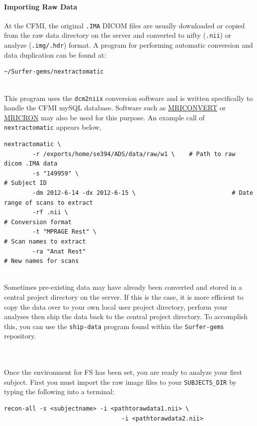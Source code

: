 \documentclass[paper=a4, fontsize=11pt]{scrartcl} %
\numberwithin{equation}{section} %
\numberwithin{figure}{section} %
\numberwithin{table}{section} %
\begin{document}
\paragraph{Importing Raw Data} At the CFMI, the original \texttt{.IMA} DICOM files are usually downloaded or copied from the raw data directory on the server and converted to nifty (\texttt{.nii}) or analyze (\texttt{.img/.hdr}) format.  A program for performing automatic conversion and data duplication can be found at:
\begin{lstlisting}
~/Surfer-gems/nextractomatic
\end{lstlisting}
~\\This program uses the \texttt{dcm2niix} conversion software and is written specifically to handle the CFMI mySQL database. Software such as \href{http://neuro.debian.net/pkgs/mriconvert.html}{MRICONVERT} or \href{http://www.mccauslandcenter.sc.edu/mricro/mricron/}{MRICRON} may also be used for this purpose.  An example call of \texttt{nextractomatic} appears below,

\begin{lstlisting}
nextractomatic \
		-r /exports/home/se394/ADS/data/raw/w1 \	# Path to raw dicom .IMA data
		-s "149959" \															# Subject ID
		-dm 2012-6-14 -dx 2012-6-15 \							# Date range of scans to extract
		-rf .nii \																# Conversion format
		-t "MPRAGE Rest" \ 												# Scan names to extract
		-ra "Anat Rest"														# New names for scans
\end{lstlisting}

~\\Sometimes pre-existing data may have already been converted and stored in a central project directory on the server.  If this is the case, it is more efficient to copy the data over to your own local user project directory, perform your analyses then ship the data back to the central project directory.  To accomplish this, you can use the \texttt{ship-data} program found within the \texttt{Surfer-gems} repository.

~\\ \\ Once the environment for FS has been set, you are ready to analyze your first subject.  First you must import the raw image files to your \texttt{SUBJECTS\_DIR} by typing the following into a terminal: \newpage
\begin{lstlisting}[frame=single, xrightmargin=0cm]
recon-all -s <subjectname> -i <pathtorawdata1.nii> \
			                     -i <pathtorawdata2.nii>
\end{lstlisting}
\end{document}
